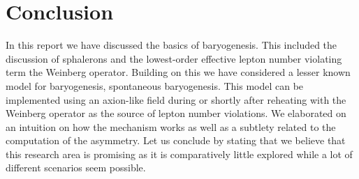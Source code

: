 \documentclass[13pt,a4paper,titlepage]{article}
\begin{document}
\section{Conclusion}
\label{sec:conclusion}
In this report we have discussed the basics of baryogenesis.
This included the discussion of sphalerons and the lowest-order effective lepton number violating term the Weinberg operator.
Building on this we have considered a lesser known model for baryogenesis, spontaneous baryogenesis. This model can be implemented using an axion-like field during or shortly after reheating with the Weinberg operator as the source of lepton number violations.
We elaborated on an intuition on how the mechanism works as well as a subtlety related to the computation of the asymmetry.
Let us conclude by stating that we believe that
this research area is promising as it is comparatively little explored while a lot of different scenarios seem possible.


\newpage
\printbibliography
\end{document}
